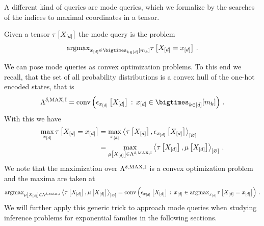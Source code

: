 \label{sec:modeQueries}

A different kind of queries are mode queries, which we formalize by the searches of the indices to maximal coordinates in a tensor.

\begin{definition}
    Given a tensor $\tau\left[X_{[d]}\right]$ the mode query is the problem
    \begin{align}
        \argmax_{\shortcatindicesin} \hypercoreat{\indexedshortcatvariables} \, .
    \end{align}
\end{definition}


We can pose mode queries as convex optimization problems.
To this end we recall, that the set of all probability distributions is a convex hull of the one-hot encoded states, that is
\begin{align*}
    \bmrealprobof{\ones}
    = \convhullof{\onehotmapofat{\shortcatindices}{\shortcatvariables}\wcols\shortcatindicesin} \, .
\end{align*}
With this we have
\begin{align*}
    \max_{x_{[d]}} \tau\left[X_{[d]}=x_{[d]}\right]
    &= \max_{x_{[d]}} \left\langle \tau\left[X_{[d]}\right],\epsilon_{x_{[d]}}\left[X_{[d]}\right]\right\rangle_{\left[ \varnothing \right]} \\
    &= \max_{\mu\left[X_{[d]}\right]\in\Lambda^{\delta,\mathrm{MAX},\mathbb{I}}} \left\langle \tau\left[X_{[d]}\right],\mu\left[X_{[d]}\right]\right\rangle_{\left[ \varnothing \right]} \, .
\end{align*}
We note that the maximization over $\Lambda^{\delta,\mathrm{MAX},\mathbb{I}}$ is a convex optimization problem and the maxima are taken at
\begin{align*}
    \mathrm{argmax}_{\mu\left[X_{[d]}\right]\in\Lambda^{\delta,\mathrm{MAX},\mathbb{I}}} \left\langle \tau\left[X_{[d]}\right],\mu\left[X_{[d]}\right]\right\rangle_{\left[ \varnothing \right]}
    = \mathrm{conv}\left(\epsilon_{x_{[d]}}\left[X_{[d]}\right]\,:\,x_{[d]}\in\mathrm{argmax}_{x_{[d]}} \tau\left[X_{[d]}=x_{[d]}\right]\right) \, .
\end{align*}
We will further apply this generic trick to approach mode queries when studying inference problems for exponential families in the following sections.

